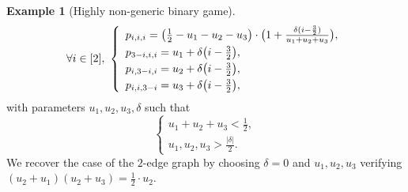 \documentclass[11pt]{amsart}
\numberwithin{equation}{section}
\theoremstyle{plain}
\numberwithin{theorem}{section}
\theoremstyle{definition}
\newtheorem{example}[theorem]{Example}
\begin{document}
\begin{example}[{Highly non-generic binary game}]
$$\forall i\in[2],~\left\{\begin{array}{l}
\vspace*{1mm}p_{i,i,i}=\big(\frac12-u_1-u_2-u_3\big)\cdot\big(1+\frac{\delta(i-\frac32)}{u_1+u_2+u_3}\big),\\
\vspace*{1mm}p_{3-i,i,i}=u_1+\delta\big(i-\frac32\big),\\
\vspace*{1mm}p_{i,3-i,i}=u_2+\delta\big(i-\frac32\big),\\
p_{i,i,3-i}=u_3+\delta\big(i-\frac32\big),
\end{array}\right.$$ with parameters $u_1,u_2,u_3,\delta$ such that $$\left\{\begin{array}{l}
    u_1+u_2+u_3<\frac12,\\
    u_1,u_2,u_3>\frac{|\delta|}2.
\end{array}\right.$$
We recover the case of the $2$-edge graph by choosing $\delta=0$ and $u_1,u_2,u_3$ verifying $(u_2+u_1)(u_2+u_3)=\frac12\cdot u_2$.
      
  \end{example}
\end{document}
